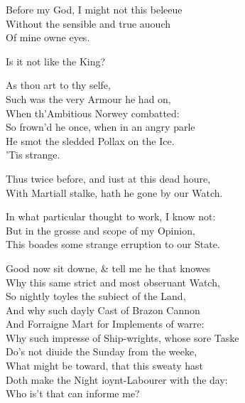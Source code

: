 \documentclass[a5paper,DIV=calc,11pt]{scrbook}
\newcommand{\updatemarks}{\markboth{Act \Roman{act}}{Scene \Roman{act}--\Roman{scene}}}
\begin{document}
\begin{drama*}
    \horspeaks Before my God, I might not this beleeue\\
    Without the sensible and true auouch\\
    Of mine owne eyes.

    \marspeaks Is it not like the King?

    \horspeaks As thou art to thy selfe,\\
    Such was the very Armour he had on,\\
    When th'Ambitious Norwey combatted:\\
    So frown'd he once, when in an angry parle\\
    He smot the sledded Pollax on the Ice.\\
    'Tis strange.

    \marspeaks Thus twice before, and iust at this dead houre,\\
    With Martiall stalke, hath he gone by our Watch.

    \horspeaks In what particular thought to work, I know not:\\
    But in the grosse and scope of my Opinion,\\
    This boades some strange erruption to our State.

    \marspeaks Good now sit downe, \& tell me he that knowes\\
    Why this same strict and most obseruant Watch,\\
    So nightly toyles the subiect of the Land,\\
    And why such dayly Cast of Brazon Cannon\\
    And Forraigne Mart for Implements of warre:\\
    Why such impresse of Ship-wrights, whose sore Taske\\
    Do's not diuide the Sunday from the weeke,\\
    What might be toward, that this sweaty hast\\
    Doth make the Night ioynt-Labourer with the day:\\
    Who is't that can informe me?
\end{drama*}

\scene

\updatemarks

\end{document}
